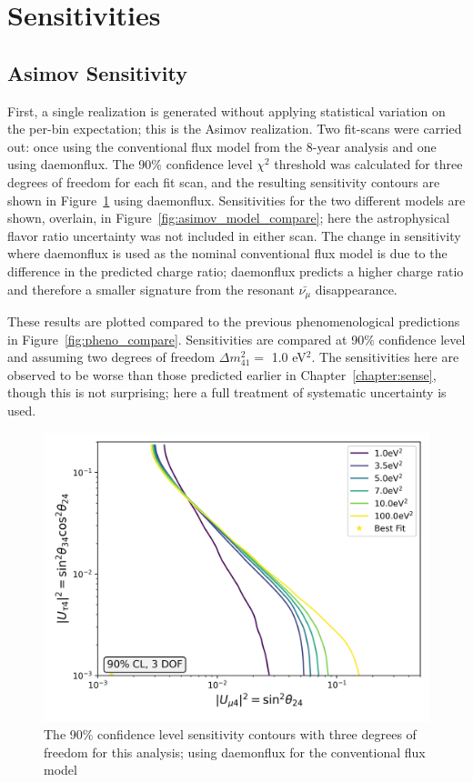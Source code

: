 \documentclass[main.tex]{subfiles}
\begin{document}
\section{Sensitivities}

\subsection{Asimov Sensitivity}

First, a single realization is generated without applying statistical variation on the per-bin expectation; this is the Asimov realization. 
Two fit-scans were carried out: once using the conventional flux model from the 8-year analysis and one using daemonflux. 
The 90\% confidence level $\chi^{2}$ threshold was calculated for three degrees of freedom for each fit scan, and the resulting sensitivity contours are shown in Figure~\ref{fig:asimov_daemon_sense} using daemonflux. 
Sensitivities for the two different models are shown, overlain, in Figure~\ref{fig:asimov_model_compare}; here the astrophysical flavor ratio uncertainty was not included in either scan. 
The change in sensitivity where daemonflux is used as the nominal conventional flux model is due to the difference in the predicted charge ratio; daemonflux predicts a higher charge ratio and therefore a smaller signature from the resonant $\bar{\nu_{\mu}}$ disappearance. 

These results are plotted compared to the previous phenomenological predictions in Figure~\ref{fig:pheno_compare}. 
Sensitivities are compared at 90\% confidence level and assuming two degrees of freedom $\Delta m_{41}^{2}=$ 1.0 eV$^{2}$.
The sensitivities here are observed to be worse than those predicted earlier in Chapter~\ref{chapter:sense}, though this is not surprising; here a full treatment of systematic uncertainty is used.

\begin{figure}
    \centering
    \includegraphics[width=0.7\linewidth]{figures/joint_daemon_asimov_with_flavor_update_Realization_daemon_newflavor_Asimov_sterile_0_cl0.9_dof3.png}
    \caption{The 90\% confidence level sensitivity contours with three degrees of freedom for this analysis; using daemonflux for the conventional flux model}\label{fig:asimov_daemon_sense}
\end{figure}
\end{document}
